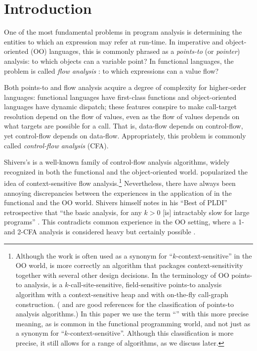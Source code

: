 








\section{Introduction}

One of the most fundamental problems in program analysis is
determining the entities to which an expression may refer at
run-time.  In imperative and object-oriented (OO) languages, this is
commonly phrased as a \emph{points-to} (or \emph{pointer}) analysis:
to which objects can a variable point? In functional languages, the
problem is called \emph{flow analysis} \cite{dvanhorn:Midtgaard2011Controlflow}:
to which expressions can a value flow?

Both points-to and flow analysis acquire a degree of complexity for
higher-order languages: functional languages have
first-class functions and object-oriented languages have dynamic
dispatch; these features conspire to make call-target resolution
depend on the flow of values, even as the flow of values depends on
what targets are possible for a call.
That is, data-flow depends on control-flow, yet control-flow depends on
data-flow.
Appropriately, this problem is commonly called
\emph{control-flow analysis} (CFA).

Shivers's \kCFA{} \cite{mattmight:Shivers:1991:CFA} is a
well-known family of control-flow analysis algorithms, widely
recognized in both the functional and the object-oriented
world. \kCFA{} popularized the  idea of context-sensitive
flow analysis.\footnote{Although the \kCFA{} work is often used as a
  synonym for ``$k$-context-sensitive'' in the OO world, \kCFA{} is more
  correctly an algorithm that packages context-sensitivity together
  with several other design decisions. In the terminology of OO
  points-to analysis, \kCFA{} is a $k$-call-site-sensitive,
  field-sensitive points-to analysis algorithm with a
  context-sensitive heap and with on-the-fly call-graph
  construction. (\citet{Lhotak:2006:PAU} and \citet{1391987} are good
  references for the classification of points-to analysis algorithms.)
  In this paper we use the term ``\kCFA'' with this more precise meaning,
  as is common in the functional programming world, and not just as a
  synonym for ``$k$-context-sensitive''. Although this classification 
  is more precise, it still allows for a range of algorithms, as we
  discuss later.} Nevertheless, there have
always been annoying discrepancies between the experiences in the
application of \kCFA{} in the functional and the OO world. Shivers
himself notes in his ``Best of PLDI'' retrospective that ``the basic
analysis, for any $k > 0$ [is] intractably slow for large programs''
\cite{dvanhorn:shivers-sigplan04}.
This contradicts common experience in the OO setting, where a 1- and
2-CFA analysis is considered heavy but certainly possible
\cite{1391987,BS-OOPSLA09}. 

